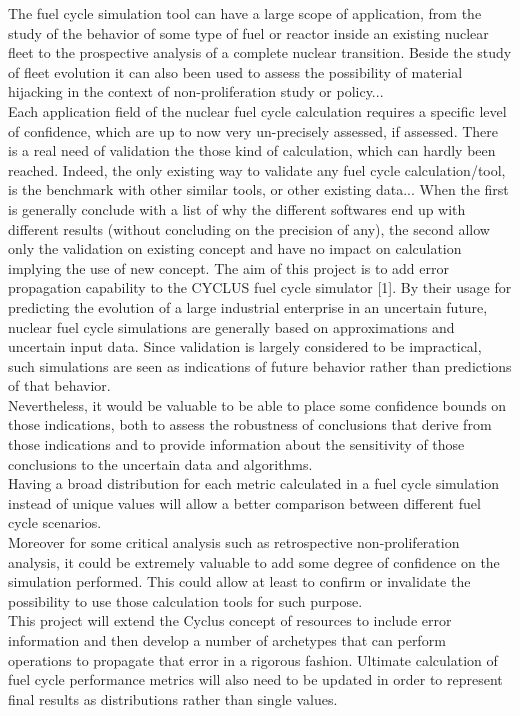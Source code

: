 \documentclass[dvips,12pt]{article}
\begin{document}
The fuel cycle simulation tool can have a large scope of application, from the study of the behavior of some type of fuel or reactor inside an existing nuclear fleet to the prospective analysis of a complete nuclear transition. Beside the study of fleet evolution it can also been used to assess the possibility of material hijacking in the context of non-proliferation study or policy...\\
Each application field of the nuclear fuel cycle calculation requires a specific level of confidence, which are up to now very un-precisely assessed, if assessed. There is a real need of validation the those kind of calculation, which can hardly been reached. Indeed, the only existing way to validate any fuel cycle calculation/tool, is the benchmark with other similar tools, or other existing data... When the first is generally conclude with a list of why the different softwares end up with different results (without concluding on the precision of any), the second allow only the validation on existing concept and have no impact on calculation implying the use of new concept. 
The aim of this project is to add error propagation capability to the CYCLUS fuel cycle simulator [1]. By their usage for predicting the evolution of a large industrial enterprise in an uncertain future, nuclear fuel cycle simulations are generally based on approximations and uncertain input data.  Since validation is largely considered to be impractical, such simulations are seen as indications of future behavior rather than predictions of that behavior. \\
Nevertheless, it would be valuable to be able to place some confidence bounds on those indications, both to assess the robustness of conclusions that derive from those indications and to provide information about the sensitivity of those conclusions to the uncertain data and algorithms.\\
Having a broad distribution for each metric calculated in a fuel cycle simulation instead of unique values will allow a better comparison between different fuel cycle scenarios.\\
Moreover for some critical analysis such as retrospective non-proliferation analysis, it could be extremely valuable to add some degree of confidence on the simulation performed. This could allow at least to confirm or invalidate the possibility to use those calculation tools for such purpose.\\
This project will extend the Cyclus concept of resources to include error information and then develop a number of archetypes that can perform operations to propagate that error in a rigorous fashion.  Ultimate calculation of fuel cycle performance metrics will also need to be updated in order to represent final results as distributions rather than single values. 
\end{document}
